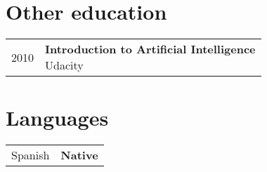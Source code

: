\documentclass[10pt,a4paper,]{article}
\makeatletter
\def\briefitem#1#2#3{
#2 & \parbox[t]{0.85\textwidth}{%
      \textbf{#1}\\[-0.1cm]{\footnotesize #3}}\\[0.4cm]}
\def\briefsection#1{\begin{longtable}{@{\extracolsep{\fill}}ll}#1\end{longtable}}
\makeatother
\begin{document}
\hypertarget{other-education}{%
\section{Other education}\label{other-education}}

\briefsection{\briefitem{Introduction to Artificial Intelligence}{2010}{Udacity}\briefitem{Measuring Causal Effects in the Social Sciences}{2016}{Coursera}\briefitem{Machine Learning}{2016}{Coursera}\briefitem{SAS Base Programmer}{2016}{SAS Institute}}

\hypertarget{languages}{%
\section{Languages}\label{languages}}

\briefsection{\briefitem{Native}{Spanish}{}\briefitem{Native}{Italian}{}\briefitem{Fluent speaker, writer, business competence}{English}{}\briefitem{Basic competence}{Polish}{}}
\end{document}
